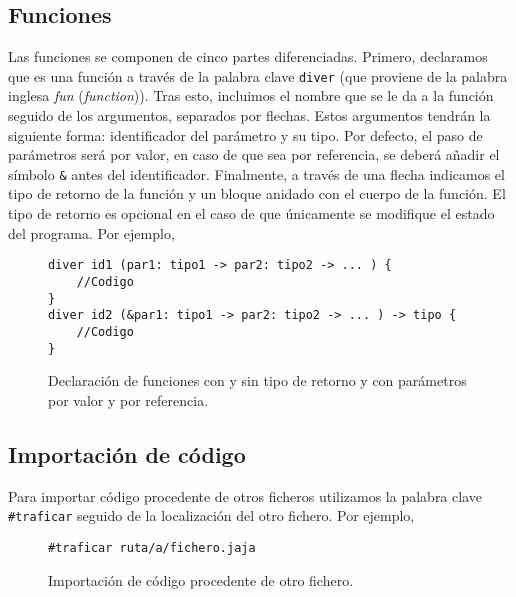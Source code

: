 \subsection*{Funciones}
Las funciones se componen de cinco partes diferenciadas. Primero, declaramos que
es una función a través de la palabra clave \lstinline{diver} (que proviene de la palabra
inglesa \textit{fun} (\textit{function})). Tras esto, incluimos el nombre que se
le da a la función seguido de los argumentos, separados por flechas. Estos
argumentos tendrán la siguiente forma: identificador del parámetro y su tipo.
Por defecto, el paso de parámetros será por valor, en caso de que sea por
referencia, se deberá añadir el símbolo \lstinline{&} antes del identificador.
Finalmente, a través de una flecha indicamos el tipo de retorno de la función y
un bloque anidado con el cuerpo de la función. El tipo de retorno es opcional en
el caso de que únicamente se modifique el estado del programa. Por ejemplo,
\begin{figure}[H]
    \centering
    \begin{lstlisting}
diver id1 (par1: tipo1 -> par2: tipo2 -> ... ) {
    //Codigo
}
diver id2 (&par1: tipo1 -> par2: tipo2 -> ... ) -> tipo {
    //Codigo
}
    \end{lstlisting}
    \caption{Declaración de funciones con y sin tipo de retorno y con parámetros
    por valor y por referencia.}
\end{figure}

\subsection*{Importación de código}
Para importar código procedente de otros ficheros utilizamos la palabra clave
\lstinline{#traficar} seguido de la localización del otro fichero. Por ejemplo,
\begin{figure}[H]
    \centering
    \begin{lstlisting}
#traficar ruta/a/fichero.jaja
    \end{lstlisting}
    \caption{Importación de código procedente de otro fichero.}
\end{figure}


